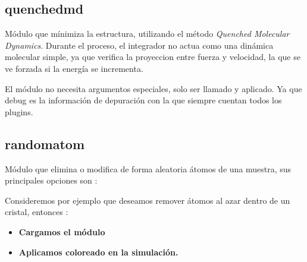 \subsection{quenchedmd}
M\'odulo que m\'inimiza la estructura, utilizando el m\'etodo \textit{Quenched Molecular Dynamics}. Durante el proceso, el integrador no actua como una din\'amica molecular simple, ya que verifica la proyeccion entre fuerza y velocidad, la que se ve forzada si la energ\'ia se incrementa.


El m\'odulo no necesita argumentos especiales, solo ser llamado y aplicado. Ya que debug es la informaci\'on de depuraci\'on con la que siempre cuentan todos los plugins.

\subsection{randomatom}
M\'odulo que elimina o modifica de forma aleatoria \'atomos de una muestra, sus principales opciones son : 


Consideremos por ejemplo que deseamos remover \'atomos al azar dentro de un cristal, entonces :

\begin{itemize}
 \item \textbf{Cargamos el m\'odulo}
 \item \textbf{Aplicamos coloreado en la simulaci\'on.}
\end{itemize}

